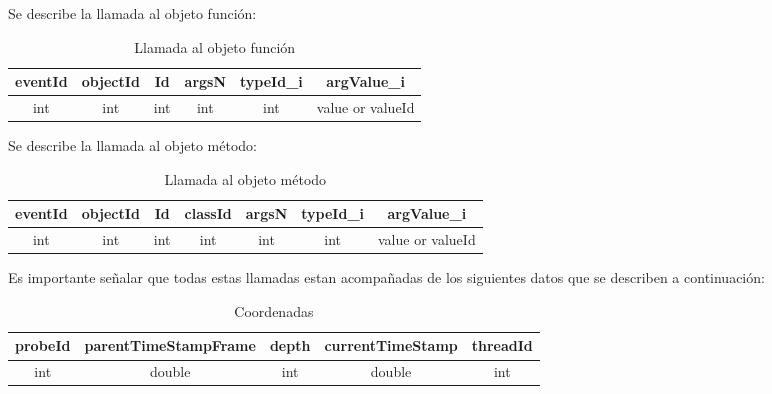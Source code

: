 \documentclass[10pt,a4paper]{article}
\begin{document}
Se describe la llamada al objeto función:\\

\begin{table}[!h]
\begin{center}
\begin{tabular}{| c | c | c | c | c | c |}
\hline
eventId & objectId & Id & argsN & typeId_{i} & argValue_{i}\\
\hline
int & int & int & int & int & value or valueId\footnotemark[1]\\
\hline
\end{tabular}
\caption{Llamada al objeto función} 
\end{center}
\end{table}

Se describe la llamada al objeto método:\\

\begin{table}[!h]
\begin{center}
\begin{tabular}{| c | c | c | c | c | c | c |}
\hline
eventId & objectId & Id & classId & argsN & typeId_{i} & argValue_{i}\\
\hline
int & int & int & int & int & int & value or valueId\footnotemark[1]\\
\hline
\end{tabular}
\caption{Llamada al objeto método} 
\end{center}
\end{table}

Es importante señalar que todas estas llamadas estan acompañadas de los siguientes datos que se describen a continuación:\\

\begin{table}[!h]
\begin{center}
\begin{tabular}{| c | c | c | c | c |}
\hline
probeId & parentTimeStampFrame & depth & currentTimeStamp & threadId\\
\hline
int & double & int & double & int \\
\hline
\end{tabular}
\caption{Coordenadas} 
\label{Coordenadas}
\end{center}
\end{table}


\newpage
\end{document}
